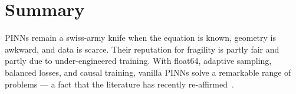 \section{Summary}
PINNs remain a swiss-army knife when the equation is known, geometry is
awkward, and data is scarce. Their reputation for fragility is partly
fair and partly due to under-engineered training. With float64,
adaptive sampling, balanced losses, and causal training, vanilla PINNs
solve a remarkable range of problems --- a fact that the literature has
recently re-affirmed~\cite{rethinking2025pinn}.
